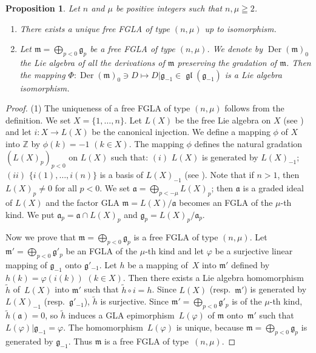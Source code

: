 \documentclass[11pt]{article}
\newtheorem{proposition}{Proposition}
\numberwithin{equation}{section}
\numberwithin{theorem}{section}
\numberwithin{proposition}{section}
\numberwithin{lemma}{section}
\numberwithin{corollary}{section}
\numberwithin{definition}{section}
\numberwithin{example}{section}
\numberwithin{remark}{section}
\numberwithin{note}{section}
\newcommand{\gl}{\operatorname{\mathfrak{gl}}}
\newcommand{\Der}{\operatorname{Der}}
\begin{document}
\begin{proposition}\label{prop2.1} Let $n$ and $\mu$ be positive integers such that $n,\mu\geqq2$.
\begin{enumerate}\itemsep=0pt
\item There exists a unique free FGLA of type
$(n,\mu)$ up to isomorphism.
\item Let $\mathfrak m=\bigoplus\limits_{p<0}\mathfrak g_p$ be a free
FGLA of type $(n,\mu)$.
We denote by $\Der(\mathfrak m)_0$ the Lie algebra of all the derivations
of $\mathfrak m$ preserving the gradation of $\mathfrak m$.
Then the mapping $\Phi:\Der(\mathfrak m)_0\ni D\mapsto D|\mathfrak g_{-1}\in\gl(\mathfrak g_{-1})$ is a Lie algebra isomorphism.
\end{enumerate}
\end{proposition}
\begin{proof} (1)
The uniqueness of a free FGLA of type $(n,\mu)$ follows from the def\/inition.
We set $X=\{1,\dots,n\}$. Let $L(X)$ be the free Lie algebra on $X$
(see \cite[Chapter~II, \S~2]{bou72:1})
and let $i:X\to L(X)$ be the canonical injection.
We def\/ine a mapping $\phi$ of $X$ into $\mathbb Z$ by $\phi(k)=-1$ $(k\in X)$.
The mapping $\phi$ def\/ines the natural gradation $(L(X)_p)_{p<0}$
on $L(X)$ such that: $(i)$ $L(X)$ is generated by $L(X)_{-1}$;
$(ii)$ $\{i(1),\dots,i(n)\}$ is a basis of $L(X)_{-1}$
(see \cite[Chapter~II, \S~2, no.~6]{bou72:1}). Note that if $n>1$, then
$L(X)_p\ne0$ for all $p<0$.
We set $\mathfrak a=\bigoplus\limits_{p<-\mu}L(X)_p$;
then $\mathfrak a$ is a graded ideal of $L(X)$ and the factor GLA $\mathfrak m=L(X)/\mathfrak a$ becomes an FGLA of the $\mu$-th kind.
We put $\mathfrak a_p=\mathfrak a\cap L(X)_p$ and
$\mathfrak g_p=L(X)_p/\mathfrak a_p$.

Now we prove that $\mathfrak m=\bigoplus\limits_{p<0}\mathfrak g_p$ is a free
FGLA of type $(n,\mu)$.
Let $\mathfrak m'=\bigoplus\limits_{p<0}\mathfrak g'_p$ be an FGLA of the
$\mu$-th kind and let
$\varphi$ be a surjective linear mapping of $\mathfrak g_{-1}$ onto
$\mathfrak g'_{-1}$.
Let $h$ be a mapping of~$X$ into $\mathfrak m'$ def\/ined by $h(k)=\varphi(i(k))$ $(k\in X)$.
Then there exists a Lie algebra homomorphism~$\tilde{h}$ of~$L(X)$
into $\mathfrak m'$ such that $\tilde{h}\circ i=h$.
Since $L(X)$ (resp.~$\mathfrak m'$) is generated by
$L(X)_{-1}$ (resp.~$\mathfrak g'_{-1}$), $\tilde{h}$ is surjective.
Since $\mathfrak m'=\bigoplus\limits_{p<0}\mathfrak g'_p$ is of the
$\mu$-th kind, $\tilde{h}(\mathfrak a)=0$, so
$\tilde{h}$ induces a GLA epimorphism~$L(\varphi)$ of
$\mathfrak m$ onto~$\mathfrak m'$ such that
$L(\varphi)|\mathfrak g_{-1}=\varphi$.
The homomorphism~$L(\varphi)$ is unique, because
$\mathfrak m=\bigoplus\limits_{p<0}\mathfrak g_p$ is generated by
$\mathfrak g_{-1}$.
Thus $\mathfrak m$ is a free FGLA of type~$(n,\mu)$.


\end{proof}
\end{document}
